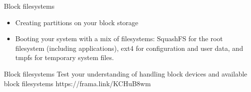 \setuplabframe
{Block filesystems}
{
  \begin{itemize}
  \item Creating partitions on your block storage
  \item Booting your system with a mix of filesystems: SquashFS for
    the root filesystem (including applications), ext4 for
    configuration and user data, and tmpfs for
    temporary system files.
  \end{itemize}
}

\quizframe
{Block filesystems}
{Test your understanding of handling block devices and available block
filesystems}
{https://frama.link/KCHuB8wm}
